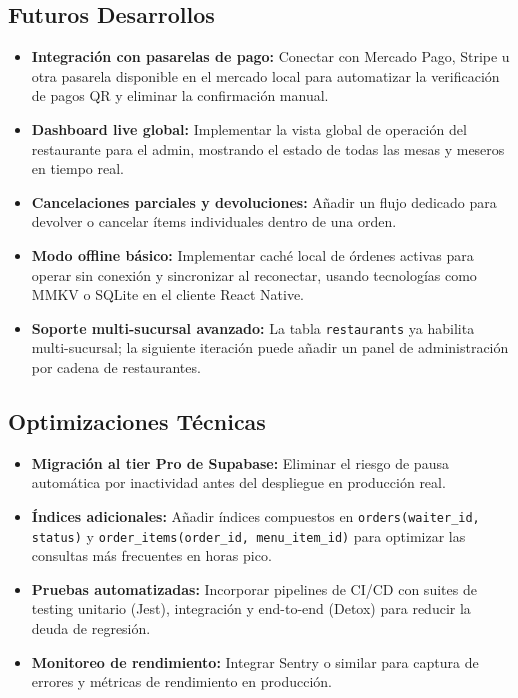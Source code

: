 \subsection{Futuros Desarrollos}

\begin{itemize}[leftmargin=1.5em]
  \item \textbf{Integración con pasarelas de pago:} Conectar con Mercado Pago,
        Stripe u otra pasarela disponible en el mercado local para automatizar
        la verificación de pagos QR y eliminar la confirmación manual.
  \item \textbf{Dashboard live global:} Implementar la vista global de operación
        del restaurante para el admin, mostrando el estado de todas las mesas
        y meseros en tiempo real.
  \item \textbf{Cancelaciones parciales y devoluciones:} Añadir un flujo
        dedicado para devolver o cancelar ítems individuales dentro de una orden.
  \item \textbf{Modo offline básico:} Implementar caché local de órdenes activas
        para operar sin conexión y sincronizar al reconectar, usando tecnologías
        como MMKV o SQLite en el cliente React Native.
  \item \textbf{Soporte multi-sucursal avanzado:} La tabla \texttt{restaurants}
        ya habilita multi-sucursal; la siguiente iteración puede añadir un panel
        de administración por cadena de restaurantes.
\end{itemize}

\subsection{Optimizaciones Técnicas}

\begin{itemize}[leftmargin=1.5em]
  \item \textbf{Migración al tier Pro de Supabase:} Eliminar el riesgo de pausa
        automática por inactividad antes del despliegue en producción real.
  \item \textbf{Índices adicionales:} Añadir índices compuestos en
        \texttt{orders(waiter\_id, status)} y
        \texttt{order\_items(order\_id, menu\_item\_id)} para optimizar
        las consultas más frecuentes en horas pico.
  \item \textbf{Pruebas automatizadas:} Incorporar pipelines de CI/CD con suites
        de testing unitario (Jest), integración y end-to-end (Detox) para reducir
        la deuda de regresión.
  \item \textbf{Monitoreo de rendimiento:} Integrar Sentry o similar para
        captura de errores y métricas de rendimiento en producción.
\end{itemize}

